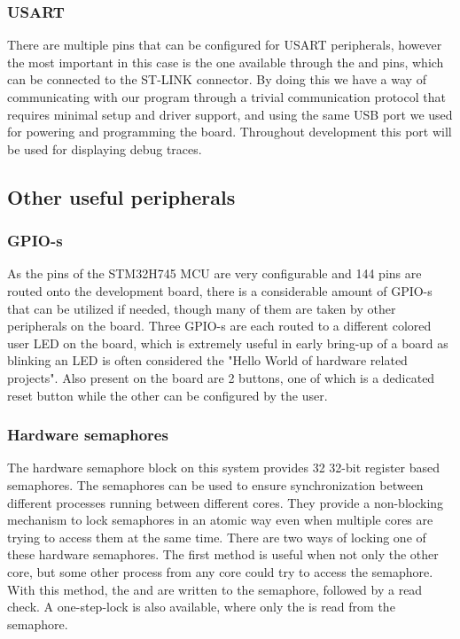 \subsubsection{USART}

There are multiple pins that can be configured for USART peripherals, however the most important in this case is the one available through the  and  pins, which can be connected to the ST-LINK connector. By doing this we have a way of communicating with our program through a trivial communication protocol that requires minimal setup and driver support, and using the same USB port we used for powering and programming the board. Throughout development this port will be used for displaying debug traces.

\subsection{Other useful peripherals}

\subsubsection{GPIO-s}

As the pins of the STM32H745 MCU are very configurable and 144 pins are routed onto the development board, there is a considerable amount of GPIO-s that can be utilized if needed, though many of them are taken by other peripherals on the board. Three GPIO-s are each routed to a different colored user LED on the board, which is extremely useful in early bring-up of a board as blinking an LED is often considered the "Hello World of hardware related projects". Also present on the board are 2 buttons, one of which is a dedicated reset button while the other can be configured by the user.

\subsubsection{Hardware semaphores}

The hardware semaphore block on this system provides 32 32-bit register based semaphores. The semaphores can be used to ensure synchronization between different processes running between different cores. They provide a non-blocking mechanism to lock semaphores in an atomic way even when multiple cores are trying to access them at the same time. There are two ways of locking one of these hardware semaphores. The first method is useful when not only the other core, but some other process from any core could try to access the semaphore. With this method, the  and  are written to the semaphore, followed by a read check. A one-step-lock is also available, where only the  is read from the semaphore.

